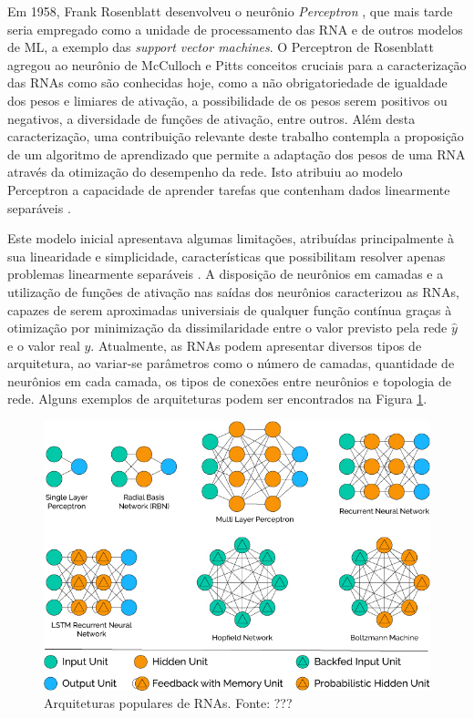 

Em 1958, Frank Rosenblatt desenvolveu o neurônio \emph{Perceptron} \cite{rosenblatt1958perceptron}, que mais tarde seria empregado como a unidade de processamento das RNA e de outros modelos de ML, a exemplo das \emph{support vector machines}. O Perceptron de Rosenblatt agregou ao neurônio de McCulloch e Pitts conceitos cruciais para a caracterização das RNAs como são conhecidas hoje, como a não obrigatoriedade de igualdade dos pesos e limiares de ativação, a possibilidade de os pesos serem positivos ou negativos, a diversidade de funções de ativação, entre outros. Além desta caracterização, uma contribuição relevante deste trabalho contempla a proposição de um algoritmo de aprendizado que permite a adaptação dos pesos de uma RNA através da otimização do desempenho da rede. Isto atribuiu ao modelo Perceptron a capacidade de aprender tarefas que contenham dados linearmente separáveis \cite{Teresa:Livro}.

Este modelo inicial apresentava algumas limitações, atribuídas principalmente à sua linearidade e simplicidade, características que possibilitam resolver apenas problemas linearmente separáveis \cite{Teresa:Livro}. A disposição de neurônios em camadas e a utilização de funções de ativação nas saídas dos neurônios caracterizou as RNAs, capazes de serem aproximadas universiais de qualquer função contínua graças à otimização por minimização da dissimilaridade entre o valor previsto pela rede $\hat{y}$ e o valor real $y$. Atualmente, as RNAs podem apresentar diversos tipos de arquitetura, ao variar-se parâmetros como o número de camadas, quantidade de neurônios em cada camada, os tipos de conexões entre neurônios e topologia de rede. Alguns exemplos de arquiteturas podem ser encontrados na Figura \ref{fig:popular_archs}.

\begin{figure}[!h]
	\caption{Arquiteturas populares de RNAs. Fonte: ???}
	\label{fig:popular_archs}
	\includegraphics[width=\linewidth]{img/popular_archs}
\end{figure}

